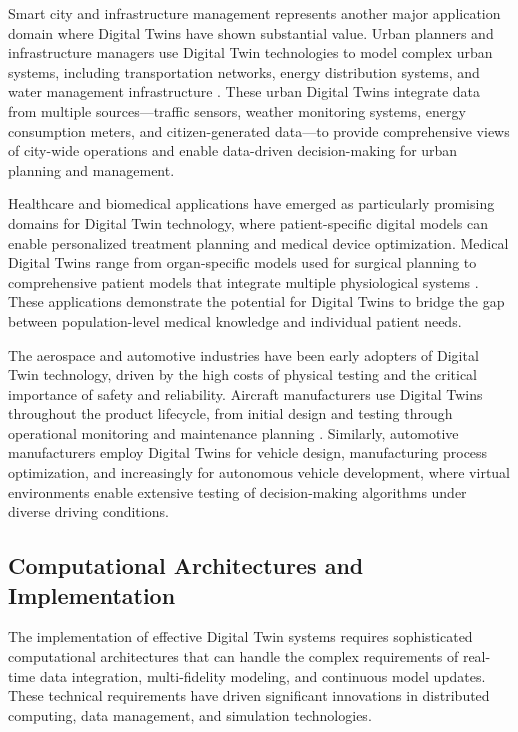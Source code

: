 Smart city and infrastructure management represents another major application domain where Digital Twins have shown substantial value. Urban planners and infrastructure managers use Digital Twin technologies to model complex urban systems, including transportation networks, energy distribution systems, and water management infrastructure \cite{deng2021systematic}. These urban Digital Twins integrate data from multiple sources—traffic sensors, weather monitoring systems, energy consumption meters, and citizen-generated data—to provide comprehensive views of city-wide operations and enable data-driven decision-making for urban planning and management.

Healthcare and biomedical applications have emerged as particularly promising domains for Digital Twin technology, where patient-specific digital models can enable personalized treatment planning and medical device optimization. Medical Digital Twins range from organ-specific models used for surgical planning to comprehensive patient models that integrate multiple physiological systems \cite{rasheed2020digital, wu2022digital}. These applications demonstrate the potential for Digital Twins to bridge the gap between population-level medical knowledge and individual patient needs.

The aerospace and automotive industries have been early adopters of Digital Twin technology, driven by the high costs of physical testing and the critical importance of safety and reliability. Aircraft manufacturers use Digital Twins throughout the product lifecycle, from initial design and testing through operational monitoring and maintenance planning \cite{liu2021review}. Similarly, automotive manufacturers employ Digital Twins for vehicle design, manufacturing process optimization, and increasingly for autonomous vehicle development, where virtual environments enable extensive testing of decision-making algorithms under diverse driving conditions.

\subsection{Computational Architectures and Implementation}

The implementation of effective Digital Twin systems requires sophisticated computational architectures that can handle the complex requirements of real-time data integration, multi-fidelity modeling, and continuous model updates. These technical requirements have driven significant innovations in distributed computing, data management, and simulation technologies.

